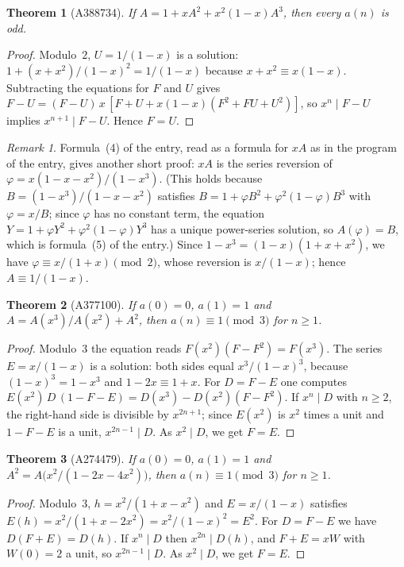 \documentclass[11pt]{article}
\newtheorem{theorem}{Theorem}
\theoremstyle{remark}
\newtheorem*{remark*}{Remark}
\begin{document}
\begin{theorem}[A388734]\label{thm:388734}
If $A=1+xA^2+x^2(1-x)A^3$, then every $a(n)$ is odd.
\end{theorem}
\begin{proof}
Modulo~$2$, $U=1/(1-x)$ is a solution: $1+(x+x^2)/(1-x)^2=1/(1-x)$ because
$x+x^2\equiv x(1-x)$. Subtracting the equations for $F$ and $U$ gives
$F-U=(F-U)\,x\,[F+U+x(1-x)(F^2+FU+U^2)]$, so $x^n\mid F-U$ implies
$x^{n+1}\mid F-U$. Hence $F=U$.
\end{proof}

\begin{remark*}
Formula~(4) of the entry, read as a formula for $xA$ as in the program of
the entry, gives another short proof: $xA$ is the series reversion of
$\varphi=x(1-x-x^2)/(1-x^3)$. (This holds because $B=(1-x^3)/(1-x-x^2)$
satisfies $B=1+\varphi B^2+\varphi^2(1-\varphi)B^3$ with $\varphi=x/B$; since
$\varphi$ has no constant term, the equation $Y=1+\varphi Y^2+\varphi^2(1-\varphi)Y^3$
has a unique power-series solution, so $A(\varphi)=B$, which is formula~(5)
of the entry.) Since $1-x^3=(1-x)(1+x+x^2)$, we have
$\varphi\equiv x/(1+x)\pmod2$, whose reversion is $x/(1-x)$; hence
$A\equiv1/(1-x)$.
\end{remark*}

\begin{theorem}[A377100]\label{thm:377100}
If $a(0)=0$, $a(1)=1$ and $A=A(x^3)/A(x^2)+A^2$, then $a(n)\equiv1\pmod3$
for $n\ge1$.
\end{theorem}
\begin{proof}
Modulo~$3$ the equation reads $F(x^2)(F-F^2)=F(x^3)$. The series $E=x/(1-x)$
is a solution: both sides equal $x^3/(1-x)^3$, because $(1-x)^3=1-x^3$ and
$1-2x\equiv1+x$. For $D=F-E$ one computes
$E(x^2)\,D\,(1-F-E)=D(x^3)-D(x^2)(F-F^2)$. If $x^n\mid D$ with $n\ge2$, the
right-hand side is divisible by $x^{2n+1}$; since $E(x^2)$ is $x^2$ times a
unit and $1-F-E$ is a unit, $x^{2n-1}\mid D$. As $x^2\mid D$, we get $F=E$.
\end{proof}

\begin{theorem}[A274479]\label{thm:274479}
If $a(0)=0$, $a(1)=1$ and $A^2=A\bigl(x^2/(1-2x-4x^2)\bigr)$, then
$a(n)\equiv1\pmod3$ for $n\ge1$.
\end{theorem}
\begin{proof}
Modulo~$3$, $h=x^2/(1+x-x^2)$ and $E=x/(1-x)$ satisfies
$E(h)=x^2/(1+x-2x^2)=x^2/(1-x)^2=E^2$. For $D=F-E$ we have $D(F+E)=D(h)$. If
$x^n\mid D$ then $x^{2n}\mid D(h)$, and $F+E=xW$ with $W(0)=2$ a unit, so
$x^{2n-1}\mid D$. As $x^2\mid D$, we get $F=E$.
\end{proof}
\end{document}
